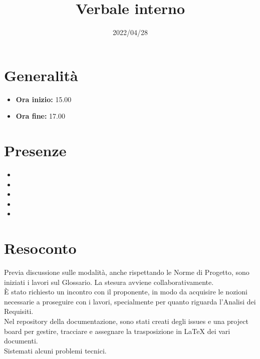 \documentclass{classes/base}
\title{Verbale interno}
\date{2022/04/28}
\author{\marcov}
\renewcommand{\maketitle}{
    
}
\begin{document}
    \maketitle

    \section*{Generalità}
    \begin{itemize}
        \item \textbf{Ora inizio:} 15.00
        \item \textbf{Ora fine:} 17.00
    \end{itemize}

    \section*{Presenze}
    \begin{itemize}
     	\item \angela
        \item \marcob
        \item \matteo
        \item \marcov
        \item \giulio
    \end{itemize}

    \section*{Resoconto}
    Previa discussione sulle modalità, anche rispettando le Norme di Progetto, sono iniziati i lavori sul Glossario. La stesura avviene collaborativamente.\\
    È stato richiesto un incontro con il proponente, in modo da acquisire le nozioni necessarie a proseguire con i lavori, specialmente per quanto riguarda l'Analisi dei Requisiti.\\
    Nel repository della documentazione, sono stati creati degli issues e una project board per gestire, tracciare e assegnare la trasposizione in \LaTeX{} dei vari documenti.\\
    Sistemati alcuni problemi tecnici.
\end{document}
